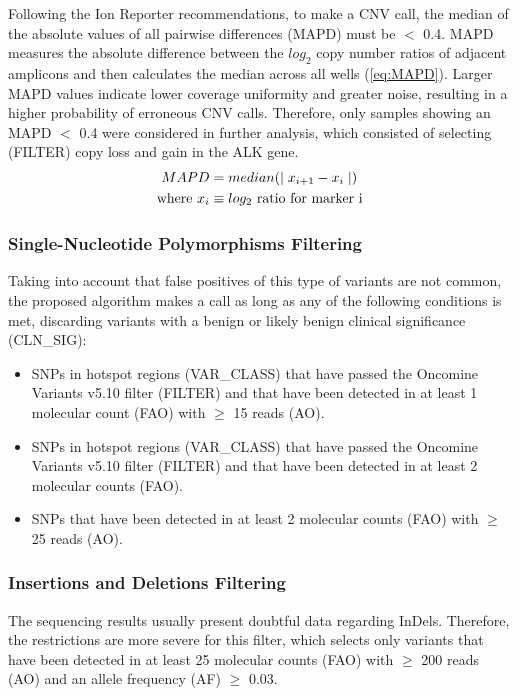 Following the Ion Reporter\texttrademark{} recommendations, to make a CNV call, the median of the absolute values of all pairwise differences (MAPD) must be $<$ 0.4. MAPD measures the absolute difference between the $log_2$ copy number ratios of adjacent amplicons and then calculates the median across all wells (\autoref{eq:MAPD}). Larger MAPD values indicate lower coverage uniformity and greater noise, resulting in a higher probability of erroneous CNV calls. Therefore, only samples showing an MAPD $<$ 0.4 were considered in further analysis, which consisted of selecting (FILTER) copy loss and gain in the ALK gene.
\begin{align} \label{eq:MAPD}
    MAPD &= median(\mid x_{i+1}-x_i \mid) \\
    \text{where}~
    x_i &\equiv \text{$log_2$ ratio for marker i} \notag
\end{align}

\subsubsection{Single-Nucleotide Polymorphisms Filtering}

Taking into account that false positives of this type of variants are not common, the proposed algorithm makes a call as long as any of the following conditions is met, discarding variants with a benign or likely benign clinical significance (CLN\_SIG):
\begin{itemize}
    \item SNPs in hotspot regions (VAR\_CLASS) that have passed the Oncomine\texttrademark{} Variants v5.10 filter (FILTER) and that have been detected in at least 1 molecular count (FAO) with $\ge$ 15 reads (AO).
    \item SNPs in hotspot regions (VAR\_CLASS) that have passed the Oncomine\texttrademark{} Variants v5.10 filter (FILTER) and that have been detected in at least 2 molecular counts (FAO).
    \item SNPs that have been detected in at least 2 molecular counts (FAO) with $\ge$ 25 reads (AO).
\end{itemize}

\subsubsection{Insertions and Deletions Filtering}

The sequencing results usually present doubtful data regarding InDels. Therefore, the restrictions are more severe for this filter, which selects only variants that have been detected in at least 25 molecular counts (FAO) with $\ge$ 200 reads (AO) and an allele frequency (AF) $\ge$ 0.03.

